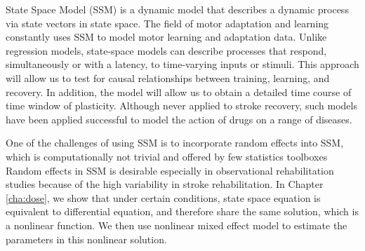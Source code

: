 State Space Model (SSM) is a dynamic model that describes a dynamic process via state vectors in state space.
The field of motor adaptation and learning constantly uses SSM to model motor learning and adaptation data.
Unlike regression models, state-space models can describe processes that respond, simultaneously or with a latency, to time-varying inputs or stimuli.
This approach will allow us to test for causal relationships between training, learning, and recovery. 
In addition, the model will allow us to obtain a detailed time course of time window of plasticity. 
Although never applied to stroke recovery, such models have been applied successful to model the action of drugs on a range of diseases.%

One of the challenges of using SSM is to incorporate random effects into SSM, which is computationally not trivial and offered by few statistics toolboxes %
Random effects in SSM is desirable especially in observational rehabilitation studies because of the high variability in stroke rehabilitation.
In Chapter \ref{cha:dose}, we show that under certain conditions, state space equation is equivalent to differential equation, and therefore share the same solution, which is a nonlinear function.
We then use nonlinear mixed effect model to estimate the parameters in this nonlinear solution.
